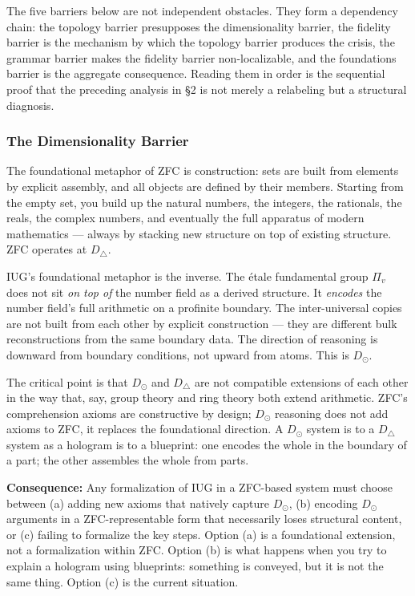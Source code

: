 \documentclass[10pt,a4paper]{article}
\begin{document}
The five barriers below are not independent obstacles.
They form a dependency chain: the topology barrier presupposes the dimensionality barrier,
the fidelity barrier is the mechanism by which the topology barrier produces the crisis,
the grammar barrier makes the fidelity barrier non-localizable, and the foundations barrier
is the aggregate consequence.
Reading them in order is the sequential proof that the preceding analysis in \S2 is not
merely a relabeling but a structural diagnosis.

\subsubsection{The Dimensionality Barrier}

The foundational metaphor of ZFC is construction: sets are built from elements by explicit
assembly, and all objects are defined by their members.
Starting from the empty set, you build up the natural numbers, the integers, the rationals,
the reals, the complex numbers, and eventually the full apparatus of modern mathematics ---
always by stacking new structure on top of existing structure.
ZFC operates at $D_{\triangle}$.

IUG's foundational metaphor is the inverse.
The étale fundamental group $\Pi_v$ does not sit \emph{on top of} the number field as a derived
structure. It \emph{encodes} the number field's full arithmetic on a profinite boundary.
The inter-universal copies are not built from each other by explicit construction ---
they are different bulk reconstructions from the same boundary data.
The direction of reasoning is downward from boundary conditions, not upward from atoms.
This is $D_\odot$.

The critical point is that $D_\odot$ and $D_\triangle$ are not compatible extensions of each
other in the way that, say, group theory and ring theory both extend arithmetic.
ZFC's comprehension axioms are constructive by design;
$D_\odot$ reasoning does not add axioms to ZFC, it replaces the foundational direction.
A $D_\odot$ system is to a $D_\triangle$ system as a hologram is to a blueprint:
one encodes the whole in the boundary of a part; the other assembles the whole from parts.

\textbf{Consequence:} Any formalization of IUG in a ZFC-based system must choose between (a)
adding new axioms that natively capture $D_\odot$, (b) encoding $D_\odot$ arguments in a
ZFC-representable form that necessarily loses structural content, or (c) failing to formalize
the key steps.
Option (a) is a foundational extension, not a formalization within ZFC.
Option (b) is what happens when you try to explain a hologram using blueprints:
something is conveyed, but it is not the same thing.
Option (c) is the current situation.
\end{document}
